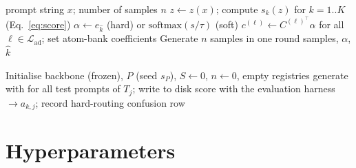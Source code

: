 \documentclass[11pt]{article}
\newcommand{\T}{^{\top}}
\newcommand{\Ladapt}{\mathcal{L}_{\mathrm{ad}}}
\begin{document}
\begin{algorithm}[h]
\caption{\textsc{Predict}$(x, n)$ --- the only inference entry point}\label{alg:predict}
\begin{algorithmic}[1]
\Require prompt string $x$; number of samples $n$ 
\State $z\gets z(x)$; compute $s_k(z)$ for $k=1..K$ (Eq.~\ref{eq:score})
\State $\alpha\gets e_{\hat k}$ (hard) or $\mathrm{softmax}(s/\tau)$ (soft)
\State $c^{(\ell)}\gets C^{(\ell)\T}\alpha$ for all $\ell\in\Ladapt$; set atom-bank coefficients
\State Generate $n$ samples in one round 
\State \Return samples, $\alpha$, $\hat k$
\end{algorithmic}
\end{algorithm}

\begin{algorithm}[h]
\caption{\textsc{RunSequence}$(T_1,\dots,T_K)$}\label{alg:run}
\begin{algorithmic}[1]
\State Initialise backbone (frozen), $P$ (seed $s_P$), $S\gets0$, $n\gets0$, empty registries
  \State {}
     \State generate with  for all test prompts of $T_j$; write to disk
     \State score with the evaluation harness $\rightarrow a_{k,j}$; record hard-routing confusion row
  \EndFor
\EndFor
\end{algorithmic}
\end{algorithm}

\clearpage
\section{Hyperparameters}\label{sec:hparams}
\end{document}

